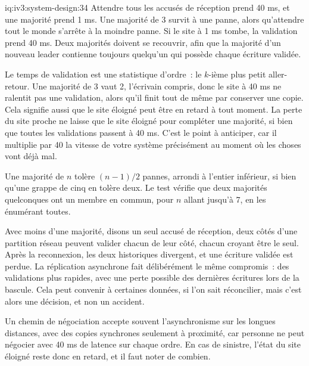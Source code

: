 \begin{solution}{iq:iv3:system-design:34}
Attendre tous les accusés de réception prend 40 ms, et une majorité prend 1 ms. Une majorité de 3 survit à une panne, alors qu'attendre tout le monde s'arrête à la moindre panne. Si le site à 1 ms tombe, la validation prend 40 ms. Deux majorités doivent se recouvrir, afin que la majorité d'un nouveau leader contienne toujours quelqu'un qui possède chaque écriture validée.
\label{lst:iv3:sd:quorum}

Le temps de validation est une statistique d'ordre~: le $k$-ième plus petit aller-retour. Une majorité de 3 vaut 2, l'écrivain compris, donc le site à 40 ms ne ralentit pas une validation, alors qu'il finit tout de même par conserver une copie. Cela signifie aussi que le site éloigné peut être en retard à tout moment. La perte du site proche ne laisse que le site éloigné pour compléter une majorité, si bien que toutes les validations passent à 40 ms. C'est le point à anticiper, car il multiplie par 40 la vitesse de votre système précisément au moment où les choses vont déjà mal.

Une majorité de $n$ tolère $(n-1)/2$ pannes, arrondi à l'entier inférieur, si bien qu'une grappe de cinq en tolère deux. Le test vérifie que deux majorités quelconques ont un membre en commun, pour $n$ allant jusqu'à 7, en les énumérant toutes.

Avec moins d'une majorité, disons un seul accusé de réception, deux côtés d'une partition réseau peuvent valider chacun de leur côté, chacun croyant être le seul. Après la reconnexion, les deux historiques divergent, et une écriture validée est perdue. La réplication asynchrone fait délibérément le même compromis~: des validations plus rapides, avec une perte possible des dernières écritures lors de la bascule. Cela peut convenir à certaines données, si l'on sait réconcilier, mais c'est alors une décision, et non un accident.

Un chemin de négociation accepte souvent l'asynchronisme sur les longues distances, avec des copies synchrones seulement à proximité, car personne ne peut négocier avec 40 ms de latence sur chaque ordre. En cas de sinistre, l'état du site éloigné reste donc en retard, et il faut noter de combien.

\end{solution}

